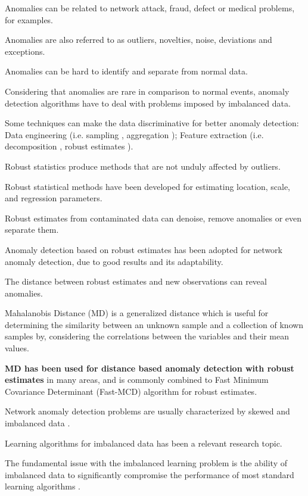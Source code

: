\documentclass[review]{elsarticle}
\begin{document}
Anomalies can be related to network attack, fraud, defect or medical problems, for examples.

Anomalies are also referred to as outliers, novelties, noise, deviations and exceptions.

Anomalies can be hard to identify and separate from normal data.

Considering that anomalies are rare in comparison to normal events, anomaly detection algorithms have to deal with problems imposed by imbalanced data.

Some techniques can make the data discriminative for better anomaly detection: Data engineering (i.e. sampling \cite{??}, aggregation \cite{callegari2011novel, acarali2016survey}); Feature extraction (i.e. decomposition \cite{??}, robust estimates \cite{??}).

Robust statistics produce methods that are not unduly affected by outliers.

Robust statistical methods have been developed for estimating location, scale, and regression parameters.

Robust estimates from contaminated data can denoise, remove anomalies or even separate them.

Anomaly detection based on robust estimates has been adopted for network anomaly detection, due to good results and its adaptability.

The distance between robust estimates and new observations can reveal anomalies.

Mahalanobis Distance (MD) is a generalized distance which is useful for determining the similarity between an unknown sample and a collection of known samples by, considering the correlations between the variables and their mean values.

\textbf{MD has been used for distance based anomaly detection with robust estimates} in many areas, and is commonly combined to Fast Minimum Covariance Determinant (Fast-MCD) algorithm \cite{rousseeuw1999fast} for robust estimates.

Network anomaly detection problems are usually characterized by skewed and imbalanced data \cite{Phua2004minority}.

Learning algorithms for imbalanced data has been a relevant research topic. 

The fundamental issue with the imbalanced learning problem is the ability of imbalanced data to significantly compromise the performance of most standard learning algorithms \cite{he2008learning}.
\end{document}
